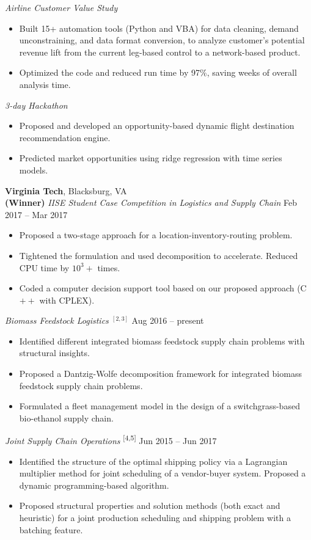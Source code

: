 \documentclass[11pt,letterpaper]{article}
\begin{document}
\smallskip
\textit{Airline Customer Value Study}
\begin{itemize}
	\item Built 15+ automation tools (Python and VBA) for data cleaning, demand unconstraining, and data format conversion, to analyze customer's potential revenue lift from the current leg-based control to a network-based product. 
	\item Optimized the code and reduced run time by 97\%, saving weeks of overall analysis time. 
\end{itemize}

\smallskip
\textit{3-day Hackathon}
\begin{itemize}
	\item Proposed and developed an opportunity-based dynamic flight destination recommendation engine. 
	\item Predicted market opportunities using ridge regression with time series models.
\end{itemize}


\medskip
\textbf{Virginia Tech}, Blacksburg, VA  \\
\textbf{(Winner)}\textit{ IISE Student Case Competition in Logistics and Supply Chain}  \hfill{{Feb 2017 -- Mar 2017}}
\begin{itemize}
	\item Proposed a two-stage approach for a location-inventory-routing problem.
	\item Tightened the formulation and used decomposition to accelerate. Reduced CPU time by $10^3 +$ times.
	\item Coded a computer decision support tool based on our proposed approach (C$++$ with CPLEX). 
\end{itemize}

\smallskip
\textit{Biomass Feedstock Logistics $^{[2,3]}$}    \hfill{{Aug 2016 -- present}} 
\begin{itemize}
	\item Identified different integrated biomass feedstock supply chain problems with structural insights.
	\item Proposed a Dantzig-Wolfe decomposition framework for integrated biomass feedstock supply chain problems.
	\item Formulated a fleet management model in the design of a switchgrass-based bio-ethanol supply chain.
\end{itemize}

\smallskip
\textit{Joint Supply Chain Operations} \textsuperscript{[4,5]}   \hfill{{Jun 2015 -- Jun 2017}} 
\begin{itemize}
	\item Identified the structure of the optimal shipping policy via a Lagrangian multiplier method for joint scheduling of a vendor-buyer system. Proposed a dynamic programming-based algorithm.
	\item Proposed structural properties and solution methods (both exact and heuristic) for a joint production scheduling and shipping problem with a batching feature.
\end{itemize}
\end{document}
